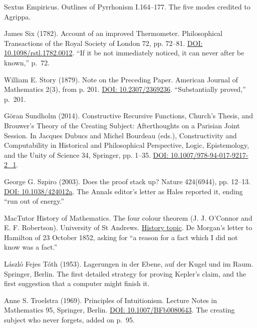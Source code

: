 \documentclass[11pt,twoside]{article}
\theoremstyle{thielethm}
\theoremstyle{thieledef}
\theoremstyle{thieledef}
\theoremstyle{thieledef}
\theoremstyle{thielethm}
\theoremstyle{thieleobs}
\theoremstyle{thielethm}
\begin{document}
\noindent Sextus Empiricus. Outlines of Pyrrhonism I.164--177. The five modes credited to Agrippa.
\par\medskip

\noindent James Six (1782). Account of an improved Thermometer. Philosophical Transactions of the Royal Society of London 72, pp. 72--81. \href{https://doi.org/10.1098/rstl.1782.0012}{DOI: 10.1098/rstl.1782.0012}. ``If it be not immediately noticed, it can never after be known,'' p.~72.
\par\medskip

\noindent William E. Story (1879). Note on the Preceding Paper. American Journal of Mathematics 2(3), from p. 201. \href{https://doi.org/10.2307/2369236}{DOI: 10.2307/2369236}. ``Substantially proved,'' p.~201.
\par\medskip

\noindent G\"oran Sundholm (2014). Constructive Recursive Functions, Church's Thesis, and Brouwer's Theory of the Creating Subject: Afterthoughts on a Parisian Joint Session. In Jacques Dubucs and Michel Bourdeau (eds.), Constructivity and Computability in Historical and Philosophical Perspective, Logic, Epistemology, and the Unity of Science 34, Springer, pp. 1--35. \href{https://doi.org/10.1007/978-94-017-9217-2_1}{DOI: 10.1007/978-94-017-9217-2\_1}.
\par\medskip

\noindent George G. Szpiro (2003). Does the proof stack up? Nature 424(6944), pp. 12--13. \href{https://doi.org/10.1038/424012a}{DOI: 10.1038/424012a}. The Annals editor's letter as Hales reported it, ending ``run out of energy.''
\par\medskip

\noindent MacTutor History of Mathematics. The four colour theorem (J. J. O'Connor and E. F. Robertson). University of St Andrews. \href{https://mathshistory.st-andrews.ac.uk/HistTopics/The_four_colour_theorem/}{History topic}. De Morgan's letter to Hamilton of 23 October 1852, asking for ``a reason for a fact which I did not know was a fact.''
\par\medskip

\noindent L\'aszl\'o Fejes T\'oth (1953). Lagerungen in der Ebene, auf der Kugel und im Raum. Springer, Berlin. The first detailed strategy for proving Kepler's claim, and the first suggestion that a computer might finish it.
\par\medskip

\noindent Anne S. Troelstra (1969). Principles of Intuitionism. Lecture Notes in Mathematics 95, Springer, Berlin. \href{https://doi.org/10.1007/BFb0080643}{DOI: 10.1007/BFb0080643}. The creating subject who never forgets, added on p.~95.
\par\medskip
\end{document}
